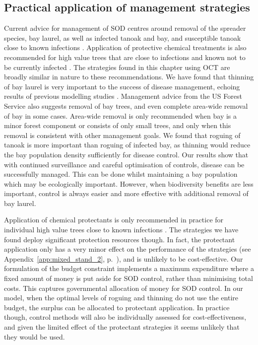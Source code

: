\subsection{Practical application of management strategies\label{sec:ch6:discussion_practical}}

Current advice for management of SOD centres around removal of the spreader species, bay laurel, as well as infected tanoak and bay, and susceptible tanoak close to known infections \citep{comtf_sudden_2014}. Application of protective chemical treatments is also recommended for high value trees that are close to infections and known not to be currently infected \citep{lee_protecting_2010}. The strategies found in this chapter using OCT are broadly similar in nature to these recommendations. We have found that thinning of bay laurel is very important to the success of disease management, echoing results of previous modelling studies \citep{cobb_resiliency_2017,ndeffo_mbah_optimization_2010}. Management advice from the US Forest Service \citep{swiecki_reference_2013} also suggests removal of bay trees, and even complete area-wide removal of bay in some cases. Area-wide removal is only recommended when bay is a minor forest component or consists of only small trees, and only when this removal is consistent with other management goals. We found that roguing of tanoak is more important than roguing of infected bay, as thinning would reduce the bay population density sufficiently for disease control. Our results show that with continued surveillance and careful optimisation of controls, disease can be successfully managed. This can be done whilst maintaining a bay population which may be ecologically important. However, when biodiversity benefits are less important, control is always easier and more effective with additional removal of bay laurel.

Application of chemical protectants is only recommended in practice for individual high value trees close to known infections \citep{comtf_sudden_2014}. The strategies we have found deploy significant protection resources though. In fact, the protectant application only has a very minor effect on the performance of the strategies (see Appendix~\ref{app:mixed_stand_2}, p.~\pageref{app:mixed_stand_2}), and is unlikely to be cost-effective. Our formulation of the budget constraint implements a maximum expenditure where a fixed amount of money is put aside for SOD control, rather than minimising total costs. This captures governmental allocation of money for SOD control. In our model, when the optimal levels of roguing and thinning do not use the entire budget, the surplus can be allocated to protectant application. In practice though, control methods will also be individually assessed for cost-effectiveness, and given the limited effect of the protectant strategies it seems unlikely that they would be used.

